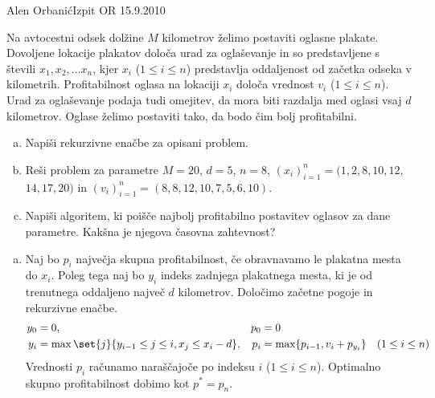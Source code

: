 \begin{naloga}{Alen Orbanić}{Izpit OR 15.9.2010}
\begin{vprasanje}
Na avtocestni odsek dolžine $M$ kilometrov
želimo postaviti oglasne plakate.
Dovoljene lokacije plakatov določa urad za oglaševanje
in so predstavljene s števili $x_1, x_2, \dots x_n$,
kjer $x_i$ ($1 \le i \le n$)
predstavlja oddaljenost od začetka odseka v kilometrih.
Profitabilnost oglasa na lokaciji $x_i$ določa vrednost $v_i$
($1 \le i \le n$).
Urad za oglaševanje podaja tudi omejitev,
da mora biti razdalja med oglasi vsaj $d$ kilometrov.
Oglase želimo postaviti tako, da bodo čim bolj profitabilni.
\begin{enumerate}[(a)]
\item Napiši rekurzivne enačbe za opisani problem.
\item Reši problem za parametre $M = 20$, $d = 5$, $n = 8$,
$(x_i)_{i=1}^n = (1, 2, 8, 10, 12,$ $14, 17, 20)$ in
$(v_i)_{i=1}^n = (8, 8, 12, 10, 7, 5, 6, 10)$.
\item Napiši algoritem,
ki poišče najbolj profitabilno postavitev oglasov za dane parametre.
Kakšna je njegova časovna zahtevnost?
\end{enumerate}
\end{vprasanje}

\begin{odgovor}
\begin{enumerate}[(a)]
\item Naj bo $p_i$ največja skupna profitabilnost,
če obravnavamo le plakatna mesta do $x_i$.
Poleg tega naj bo $y_i$ indeks zadnjega plakatnega mesta,
ki je od tre\-nut\-ne\-ga oddaljeno največ $d$ kilometrov.
Določimo začetne pogoje in rekurzivne enačbe.
\begin{align*}
y_0 &= 0, & p_0 &= 0 \\
y_i &= \max\set{j}{y_{i-1} \le j \le i, x_j \le x_i - d},
& p_i &= \max\{p_{i-1}, v_i + p_{y_i}\} \quad (1 \le i \le n)
\end{align*}
Vrednosti $p_i$ računamo naraščajoče po indeksu $i$ ($1 \le i \le n$).
Optimalno skupno profitabilnost dobimo kot $p^* = p_n$.


\end{enumerate}
\end{odgovor}
\end{naloga}
